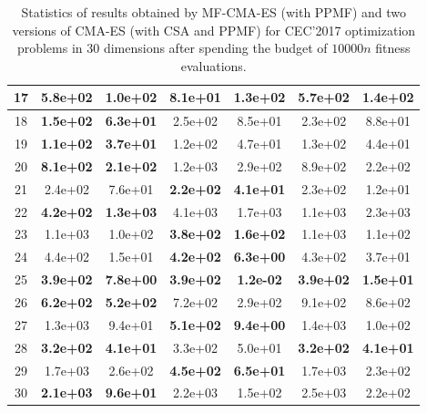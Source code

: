 \begin{table}[t!]
{\begin{tabular}{c|c|c|c|c|c|c}
\hline
17 & 5.8e+02 & 1.0e+02 & \textbf{8.1e+01} & \textbf{1.3e+02} & 5.7e+02 & 1.4e+02\\
\hline
18 & \textbf{1.5e+02} & \textbf{6.3e+01} & 2.5e+02 & 8.5e+01 & 2.3e+02 & 8.8e+01\\
\hline
19 & \textbf{1.1e+02} & \textbf{3.7e+01} & 1.2e+02 & 4.7e+01 & 1.3e+02 & 4.4e+01\\
\hline
20 & \textbf{8.1e+02} & \textbf{2.1e+02} & 1.2e+03 & 2.9e+02 & 8.9e+02 & 2.2e+02\\
\hline
21 & 2.4e+02 & 7.6e+01 & \textbf{2.2e+02} & \textbf{4.1e+01} & 2.3e+02 & 1.2e+01\\
\hline
22 & \textbf{4.2e+02} & \textbf{1.3e+03} & 4.1e+03 & 1.7e+03 & 1.1e+03 & 2.3e+03\\
\hline
23 & 1.1e+03 & 1.0e+02 & \textbf{3.8e+02} & \textbf{1.6e+02} & 1.1e+03 & 1.1e+02\\
\hline
24 & 4.4e+02 & 1.5e+01 & \textbf{4.2e+02} & \textbf{6.3e+00} & 4.3e+02 & 3.7e+01\\
\hline
25 & \textbf{3.9e+02} & \textbf{7.8e+00} & \textbf{3.9e+02} & \textbf{1.2e-02} & \textbf{3.9e+02} & \textbf{1.5e+01}\\
\hline
26 & \textbf{6.2e+02} & \textbf{5.2e+02} & 7.2e+02 & 2.9e+02 & 9.1e+02 & 8.6e+02\\
\hline
27 & 1.3e+03 & 9.4e+01 & \textbf{5.1e+02} & \textbf{9.4e+00} & 1.4e+03 & 1.0e+02\\
\hline
28 & \textbf{3.2e+02} & \textbf{4.1e+01} & 3.3e+02 & 5.0e+01 & \textbf{3.2e+02} & \textbf{4.1e+01}\\
\hline
29 & 1.7e+03 & 2.6e+02 & \textbf{4.5e+02} & \textbf{6.5e+01} & 1.7e+03 & 2.3e+02\\
\hline
30 & \textbf{2.1e+03} & \textbf{9.6e+01} & 2.2e+03 & 1.5e+02 & 2.5e+03 & 2.2e+02\\
\bottomrule
\end{tabular}
}
\caption{Statistics of results obtained by MF-CMA-ES (with PPMF) and two versions of CMA-ES (with CSA and PPMF) for CEC'2017 optimization problems in 30 dimensions after spending the budget of $10000n$ fitness evaluations.}
\label{tab:CEC17-D30}
\end{table}